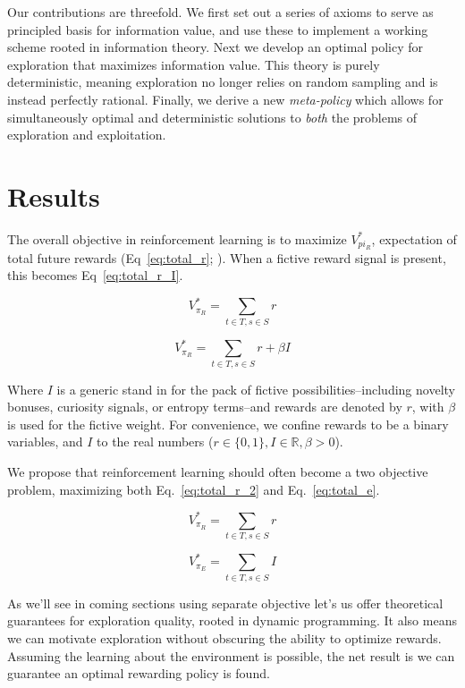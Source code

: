 \documentclass[9pt,twocolumn,twoside]{pnas-new}
\begin{document}
Our contributions are threefold. We first set out a series of axioms to serve as principled basis for information value, and use these to implement a working scheme rooted in information theory. Next we develop an optimal policy for exploration that maximizes information value. This theory is purely deterministic, meaning exploration no longer relies on random sampling and is instead perfectly rational. Finally, we derive a new \textit{meta-policy} which allows for simultaneously optimal and deterministic solutions to \textit{both} the problems of exploration and exploitation.

\section*{Results}
The overall objective in reinforcement learning is to maximize $V^{*}_{pi_R}$, expectation of total future rewards (Eq~\ref{eq:total_r}; \cite{Sutton2018}). When a fictive reward signal is present, this becomes Eq~\ref{eq:total_r_I}.

\begin{equation}
    V^{*}_{\pi_R} = \sum_{t \in T, s \in S} r
    \label{eq:total_r}
\end{equation}

\begin{equation}
    V^{*}_{\pi_R} = \sum_{t \in T, s \in S} r + \beta I
    \label{eq:total_r_I}
\end{equation}

Where $I$ is a generic stand in for the pack of fictive possibilities--including novelty bonuses, curiosity signals, or entropy terms--and rewards are denoted by $r$, with $\beta$ is used for the fictive weight. For convenience, we confine rewards to be a binary variables, and $I$ to the real numbers ($r \in \{0, 1\}, I \in \mathbb{R}, \beta > 0$).

We propose that reinforcement learning should often become a two objective problem, maximizing both Eq.~\ref{eq:total_r_2} and Eq.~\ref{eq:total_e}. 

\begin{equation}
    V^{*}_{\pi_R} = \sum_{t \in T, s \in S} r
    \label{eq:total_r_2}
\end{equation}

\begin{equation}
    V^{*}_{\pi_E} = \sum_{t \in T, s \in S} I
    \label{eq:total_e}
\end{equation}

As we'll see in coming sections using separate objective let's us offer theoretical guarantees for exploration quality, rooted in dynamic programming. It also means we can motivate exploration without obscuring the ability to optimize rewards. Assuming the learning about the environment is possible, the net result is we can guarantee an optimal rewarding policy is found.
\end{document}
